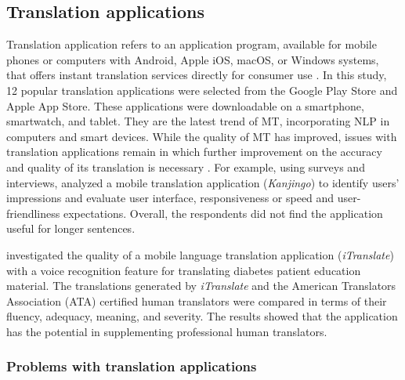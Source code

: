 \documentclass[english]{textolivre}
\begin{document}
\subsection{Translation applications}\label{sec-conduta}
Translation application refers to an application program, available for mobile phones or computers with Android, Apple iOS, macOS, or Windows systems, that offers instant translation services directly for consumer use \cite{chen_machine_2017}. In this study, 12 popular translation applications were selected from the Google Play Store and Apple App Store. These applications were downloadable on a smartphone, smartwatch, and tablet. They are the latest trend of MT, incorporating NLP in computers and smart devices. While the quality of MT has improved, issues with translation applications remain in which further improvement on the accuracy and quality of its translation is necessary \cite{gunarto_apps-based_2019}. For example, using surveys and interviews, \textcite{moorkens_developing_2016} analyzed a mobile translation application (\textit{Kanjingo}) to identify users’ impressions and evaluate user interface, responsiveness or speed and user-friendliness expectations. Overall, the respondents did not find the application useful for longer sentences.

\textcite{chen_machine_2017} investigated the quality of a mobile language translation application (\textit{iTranslate}) with a voice recognition feature for translating diabetes patient education material. The translations generated by \textit{iTranslate} and the American Translators Association (ATA) certified human translators were compared in terms of their fluency, adequacy, meaning, and severity. The results showed that the application has the potential in supplementing professional human translators.


\subsubsection{Problems with translation applications}\label{sec-fmt-manuscrito}
\end{document}
